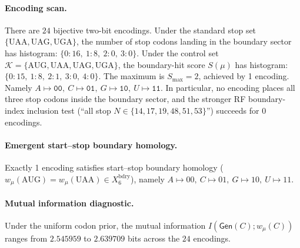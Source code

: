 \paragraph{Encoding scan.}
There are $24$ bijective two-bit encodings. Under the standard stop set $\{\mathrm{UAA,UAG,UGA}\}$, the number of stop codons landing in the boundary sector has histogram: $\{0:16,\ 1:8,\ 2:0,\ 3:0\}$.
Under the control set $\mathcal{K}=\{\mathrm{AUG,UAA,UAG,UGA}\}$, the boundary-hit score $S(\mu)$ has histogram: $\{0:15,\ 1:8,\ 2:1,\ 3:0,\ 4:0\}$.
The maximum is $S_{\max}=2$, achieved by 1 encoding. Namely $A\mapsto \texttt{00},\ C\mapsto \texttt{01},\ G\mapsto \texttt{10},\ U\mapsto \texttt{11}$.
In particular, no encoding places all three stop codons inside the boundary sector, and the stronger RF boundary-index inclusion test (``all stop $N\in\{14,17,19,48,51,53\}$'') succeeds for 0 encodings.

\paragraph{Emergent start--stop boundary homology.}
Exactly 1 encoding satisfies start--stop boundary homology ($w_\mu(\mathrm{AUG})=w_\mu(\mathrm{UAA})\in X_6^\mathrm{bdry}$), namely $A\mapsto 00,\ C\mapsto 01,\ G\mapsto 10,\ U\mapsto 11$.

\paragraph{Mutual information diagnostic.}
Under the uniform codon prior, the mutual information $I(\mathsf{Gen}(C);w_\mu(C))$ ranges from $2.545959$ to $2.639709$ bits across the $24$ encodings.
